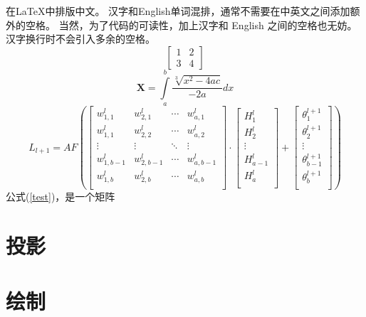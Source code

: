 \documentclass[12pt,oneside,a4paper]{ctexart}
\begin{document}
在\LaTeX{}中排版中文。
汉字和English单词混排，通常不需要在中英文之间添加额外的空格。
当然，为了代码的可读性，加上汉字和 English 之间的空格也无妨。
汉字换行时不会引入多余的空格。
\begin{equation}
	\begin{bmatrix}
		1 & 2 \\
		3 & 4
	\end{bmatrix}
	\label{test}
\end{equation}
\begin{equation}
	\mathbf{X}=\int\limits_{a}^{b} \frac{\sqrt[3]{x^2-4ac} }{-2a} dx
\end{equation}
\begin{equation}
	L_{l+1}=AF\left(
	\begin{bmatrix}
			w^l_{1,1}   & w^l_{2,1}   & \cdots & w^l_{a,1}   \\
			w^l_{1,1}   & w^l_{2,2}   & \cdots & w^l_{a,2}   \\
			\vdots      & \vdots      & \ddots & \vdots      \\
			w^l_{1,b-1} & w^l_{2,b-1} & \cdots & w^l_{a,b-1} \\
			w^l_{1,b}   & w^l_{2,b}   & \cdots & w^l_{a,b}   \\
		\end{bmatrix}
	\cdot
	\begin{bmatrix}
			H^l_1     \\
			H^l_2     \\
			\vdots    \\
			H^l_{a-1} \\
			H^l_{a}   \\
		\end{bmatrix}
	+
	\begin{bmatrix}
			\theta{}^{l+1}_1     \\
			\theta{}^{l+1}_2     \\
			\vdots               \\
			\theta{}^{l+1}_{b-1} \\
			\theta{}^{l+1}_{b}   \\
		\end{bmatrix}
	\right)\label{test2}
\end{equation}
公式(\ref{test})，是一个矩阵
\section{投影}
\section{绘制}
\end{document}
